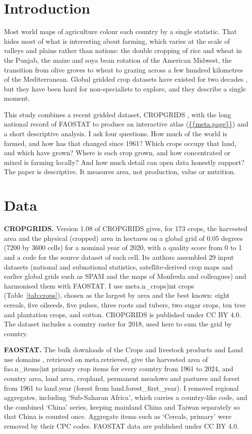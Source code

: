 \documentclass[11pt,a4paper]{article}
\begin{document}
\section{Introduction}
Most world maps of agriculture colour each country by a single statistic. That hides most of what is interesting about farming, which varies at the scale of valleys and plains rather than nations: the double cropping of rice and wheat in the Punjab, the maize and soya bean rotation of the American Midwest, the transition from olive groves to wheat to grazing across a few hundred kilometres of the Mediterranean. Global gridded crop datasets have existed for two decades \citep{monfreda,spam}, but they have been hard for non-specialists to explore, and they describe a single moment.

This study combines a recent gridded dataset, CROPGRIDS \citep{cropgrids}, with the long national record of FAOSTAT \citep{faostat} to produce an interactive atlas (\url{{{meta.page}}}) and a short descriptive analysis. I ask four questions. How much of the world is farmed, and how has that changed since 1961? Which crops occupy that land, and which have grown? Where is each crop grown, and how concentrated or mixed is farming locally? And how much detail can open data honestly support? The paper is descriptive. It measures area, not production, value or nutrition.

\section{Data}
\textbf{CROPGRIDS.} Version 1.08 of CROPGRIDS \citep{cropgrids} gives, for 173 crops, the harvested area and the physical (cropped) area in hectares on a global grid of 0.05 degrees (7200 by 3600 cells) for a nominal year of 2020, with a quality score from 0 to 1 and a code for the source dataset of each cell. Its authors assembled 29 input datasets (national and subnational statistics, satellite-derived crop maps and earlier global grids such as SPAM and the maps of Monfreda and colleagues) and harmonised them with FAOSTAT. I use {{meta.n_crops|int}} crops (Table~\ref{tab:crops}), chosen as the largest by area and the best known: eight cereals, five oilseeds, five pulses, three roots and tubers, two sugar crops, ten tree and plantation crops, and cotton. CROPGRIDS is published under CC BY 4.0. The dataset includes a country raster for 2018, used here to sum the grid by country.

\textbf{FAOSTAT.} The bulk downloads of the Crops and livestock products and Land use domains \citep{faostat}, retrieved on {{meta.retrieved}}, give the harvested area of {{fao.n_items|int}} primary crop items for every country from 1961 to 2024, and country area, land area, cropland, permanent meadows and pastures and forest from 1961 to {{land.year}} (forest from {{land.forest_first_year}}). I removed regional aggregates, including `Sub-Saharan Africa', which carries a country-like code, and the combined `China' series, keeping mainland China and Taiwan separately so that China is counted once. Aggregate items such as `Cereals, primary' were removed by their CPC codes. FAOSTAT data are published under CC BY 4.0.
\end{document}
